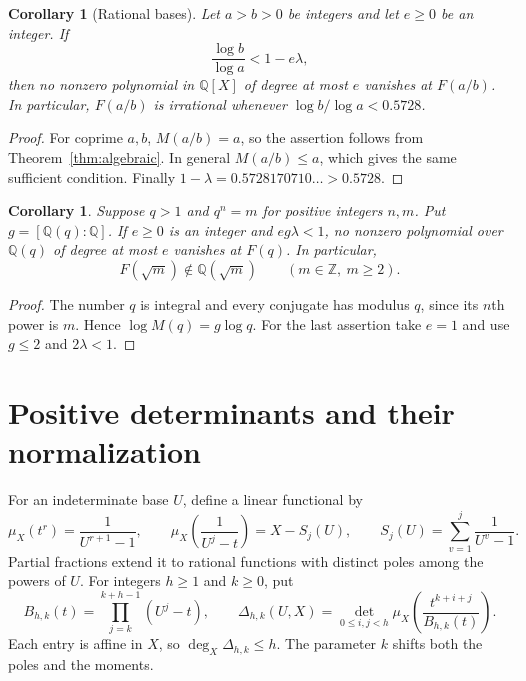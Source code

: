 \documentclass[12pt]{article}
\newtheorem{corollary}[theorem]{Corollary}
\theoremstyle{remark}
\newcommand{\Q}{\mathbb Q}
\newcommand{\Z}{\mathbb Z}
\begin{document}
\begin{corollary}[Rational bases]\label{cor:rational}
Let $a>b>0$ be integers and let $e\geq0$ be an integer. If
\[
\frac{\log b}{\log a}<1-e\lambda,
\]
then no nonzero polynomial in $\Q[X]$ of degree at most $e$ vanishes at $F(a/b)$.
In particular, $F(a/b)$ is irrational whenever $\log b/\log a<0.5728$.
\end{corollary}
\begin{proof}
For coprime $a,b$, $M(a/b)=a$, so the assertion follows from
Theorem~\ref{thm:algebraic}. In general $M(a/b)\leq a$, which gives the same
sufficient condition. Finally $1-\lambda=0.5728170710\ldots>0.5728$.
\end{proof}

\begin{corollary}\label{cor:radical}
Suppose $q>1$ and $q^n=m$ for positive integers $n,m$. Put $g=[\Q(q):\Q]$.
If $e\geq0$ is an integer and $eg\lambda<1$, no nonzero polynomial over $\Q(q)$ of degree at most $e$ vanishes at $F(q)$.
In particular,
\[
F(\sqrt m)\notin\Q(\sqrt m)\qquad(m\in\Z,\ m\geq2).
\]
\end{corollary}
\begin{proof}
The number $q$ is integral and every conjugate has modulus $q$, since its $n$th power is $m$.
Hence $\log M(q)=g\log q$. For the last assertion take $e=1$ and use $g\leq2$ and $2\lambda<1$.
\end{proof}

\section{Positive determinants and their normalization}\label{sec:determinants}

For an indeterminate base $U$, define a linear functional by
\begin{equation}\label{eq:functional}
\mu_X(t^r)=\frac1{U^{r+1}-1},\qquad
\mu_X\!\left(\frac1{U^j-t}\right)=X-S_j(U),\qquad
S_j(U)=\sum_{v=1}^{j}\frac1{U^v-1}.
\end{equation}
Partial fractions extend it to rational functions with distinct poles among the powers of $U$.
For integers $h\geq1$ and $k\geq0$, put
\begin{equation}\label{eq:delta}
B_{h,k}(t)=\prod_{j=k}^{k+h-1}(U^j-t),\qquad
\Delta_{h,k}(U,X)=\det_{0\leq i,j<h}
\mu_X\!\left(\frac{t^{k+i+j}}{B_{h,k}(t)}\right).
\end{equation}
Each entry is affine in $X$, so $\deg_X\Delta_{h,k}\leq h$.
The parameter $k$ shifts both the poles and the moments.
\end{document}
